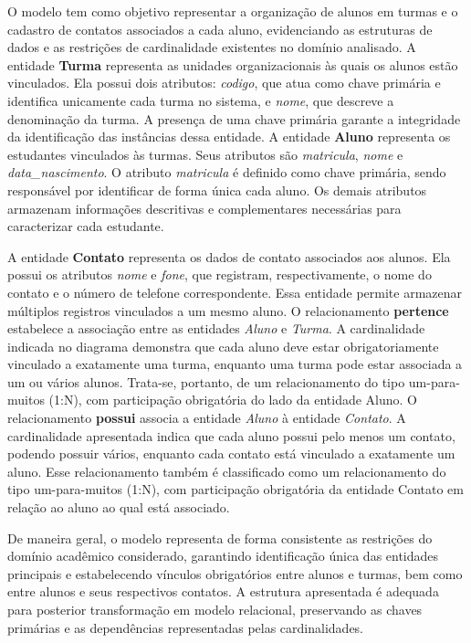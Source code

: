 O modelo tem como objetivo representar a organização de alunos em turmas e o cadastro de contatos associados a cada aluno, evidenciando as estruturas de dados e as restrições de cardinalidade existentes no domínio analisado. A entidade \textbf{Turma} representa as unidades organizacionais às quais os alunos estão vinculados. Ela possui dois atributos: \textit{codigo}, que atua como chave primária e identifica unicamente cada turma no sistema, e \textit{nome}, que descreve a denominação da turma. A presença de uma chave primária garante a integridade da identificação das instâncias dessa entidade. A entidade \textbf{Aluno} representa os estudantes vinculados às turmas. Seus atributos são \textit{matricula}, \textit{nome} e \textit{data\_nascimento}. O atributo \textit{matricula} é definido como chave primária, sendo responsável por identificar de forma única cada aluno. Os demais atributos armazenam informações descritivas e complementares necessárias para caracterizar cada estudante.

A entidade \textbf{Contato} representa os dados de contato associados aos alunos. Ela possui os atributos \textit{nome} e \textit{fone}, que registram, respectivamente, o nome do contato e o número de telefone correspondente. Essa entidade permite armazenar múltiplos registros vinculados a um mesmo aluno. O relacionamento \textbf{pertence} estabelece a associação entre as entidades \textit{Aluno} e \textit{Turma}. A cardinalidade indicada no diagrama demonstra que cada aluno deve estar obrigatoriamente vinculado a exatamente uma turma, enquanto uma turma pode estar associada a um ou vários alunos. Trata-se, portanto, de um relacionamento do tipo um-para-muitos (1:N), com participação obrigatória do lado da entidade Aluno. O relacionamento \textbf{possui} associa a entidade \textit{Aluno} à entidade \textit{Contato}. A cardinalidade apresentada indica que cada aluno possui pelo menos um contato, podendo possuir vários, enquanto cada contato está vinculado a exatamente um aluno. Esse relacionamento também é classificado como um relacionamento do tipo um-para-muitos (1:N), com participação obrigatória da entidade Contato em relação ao aluno ao qual está associado.

De maneira geral, o modelo representa de forma consistente as restrições do domínio acadêmico considerado, garantindo identificação única das entidades principais e estabelecendo vínculos obrigatórios entre alunos e turmas, bem como entre alunos e seus respectivos contatos. A estrutura apresentada é adequada para posterior transformação em modelo relacional, preservando as chaves primárias e as dependências representadas pelas cardinalidades.

